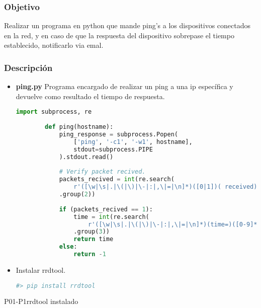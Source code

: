 \subsubsection{Objetivo}
Realizar un programa en python que mande ping's a los dispositivos conectados en la red, y en caso de que la respuesta del dispositivo sobrepase el tiempo establecido, notificarlo via emal.

\subsubsection{Descripción}
\begin{itemize}
	\item {\bf ping.py} Programa encargado de realizar un ping a una ip específica y devuelve como resultado el tiempo de respuesta.\\
	\begin{lstlisting}[language=python]
		import subprocess, re
		
		def ping(hostname):
			ping_response = subprocess.Popen(
				['ping', '-c1', '-w1', hostname],
				stdout=subprocess.PIPE
			).stdout.read()
			
			# Verify packet recived.
			packets_recived = int(re.search(
				r'([\w|\s|.|\(|\)|\-|:|,\|=|\n]*)([0|1])( received)', ping_response)
			.group(2))
			
			if (packets_recived == 1):
				time = int(re.search(
					r'([\w|\s|.|\(|\)|\-|:|,\|=|\n]*)(time=)([0-9]*)( ms)', ping_response)
				.group(3))
				return time
			else:
				return -1
	\end{lstlisting}
	\item Instalar rrdtool.\\
	\begin{lstlisting}[language=bash]
	#> pip install rrdtool
	\end{lstlisting}
\end{itemize}

\newpage
\begin{prueba}{P01-P1}{rrdtool instalado}
\end{prueba}

